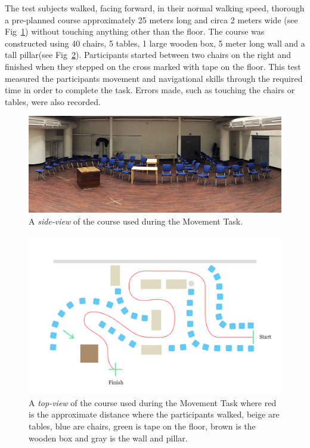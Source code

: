 \documentclass[runningheads,a4paper,oribibl]{llncs}
\begin{document}
The test subjects walked, facing forward, in their normal walking speed, thorough a pre-planned course approximately 25 meters long and circa 2 meters wide (see Fig~\ref{fig:Course}) without touching anything other than the floor. The course was constructed using 40 chairs, 5 tables, 1 large wooden box, 5 meter long wall and a tall pillar(see Fig~\ref{fig:CourseTop}). Participants started between two chairs on the right and finished when they stepped on the cross marked with tape on the floor. This test measured the participants movement and navigational skills through the required time in order to complete the task. Errors made, such as touching the chairs or tables, were also recorded.

\begin{figure}
   \centering
   \includegraphics[width=\textwidth]{ExternalMaterial/Course2}
   \caption{A \emph{side-view} of the course used during the Movement Task.} \label{fig:Course}
\end{figure}

\begin{figure}
   \centering
   \includegraphics[width=\textwidth]{ExternalMaterial/Course-top}
   \caption{A \emph{top-view} of the course used during the Movement Task where red is the approximate distance where the participants walked, beige are tables, blue are chairs, green is tape on the floor, brown is the wooden box and gray is the wall and pillar.} \label{fig:CourseTop}
\end{figure}
\end{document}
